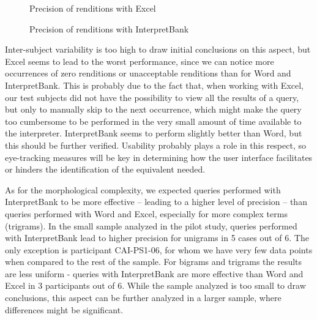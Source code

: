 \documentclass[output=paper]{langsci/langscibook}
\begin{document}
\begin{figure}
\caption{Precision of renditions with Excel}
\label{fig:prandi:13}
\end{figure}

\begin{figure}
\caption{Precision of renditions with InterpretBank}
\label{fig:prandi:14}
\end{figure}

Inter-subject variability is too high to draw initial conclusions on this aspect, but Excel seems to lead to the worst performance, since we can notice more occurrences of zero renditions or unacceptable renditions than for Word and InterpretBank. This is probably due to the fact that, when working with Excel, our test subjects did not have the possibility to view all the results of a query, but only to manually skip to the next occurrence, which might make the query too cumbersome to be performed in the very small amount of time available to the interpreter. InterpretBank seems to perform slightly better than Word, but this should be further verified. Usability probably plays a role in this respect, so eye-tracking measures will be key in determining how the user interface facilitates or hinders the identification of the equivalent needed.

As for the morphological complexity, we expected queries performed with InterpretBank to be more effective – leading to a higher level of precision – than queries performed with Word and Excel, especially for more complex terms (trigrams). In the small sample analyzed in the pilot study, queries performed with InterpretBank lead to higher precision for unigrams in 5 cases out of 6. The only exception is participant \textsc{CAI}-PS1-06, for whom we have very few data points when compared to the rest of the sample. For bigrams and trigrams the results are less uniform - queries with InterpretBank are more effective than Word and Excel in 3 participants out of 6. While the sample analyzed is too small to draw conclusions, this aspect can be further analyzed in a larger sample, where differences might be significant.
\end{document}
